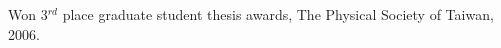 \documentclass[letterpaper]{deedy-resume-openfont}
\begin{document}
\begin{tightemize}
\item Won 3$^{rd}$ place graduate student thesis awards, The Physical Society of Taiwan, 2006.
\end{tightemize}
\sectionsep

\end{document}
